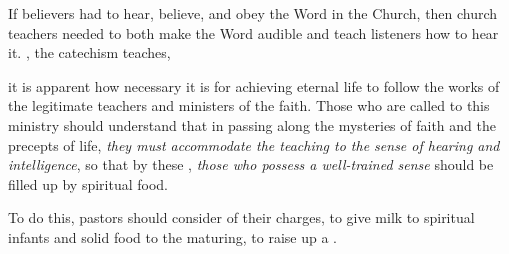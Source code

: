 If believers had to hear, believe, and obey the Word in the Church, then church
teachers needed to both make the Word audible and teach listeners how to hear
it. 
, the
catechism teaches, 
\begin{quoting}
    it is apparent how necessary it is for achieving eternal life to follow the
    works of the legitimate teachers and ministers of the faith. 
    \Dots{} Those who are called to this ministry should understand that in
    passing along the mysteries of faith and the precepts of life, \emph{they
    must accommodate the teaching to the sense of hearing and intelligence}, so
    that by these , \emph{those who possess a
    well-trained sense} should be filled up by spiritual food.%
        \Autocite[2, 8--9 (emphasis added)]{Catholic:Catechismus1614}
\end{quoting}
To do this, pastors should consider  of their charges, to give milk to
spiritual infants and solid food to the maturing, to raise up a .%
    \Autocite[8]{Catholic:Catechismus1614}


